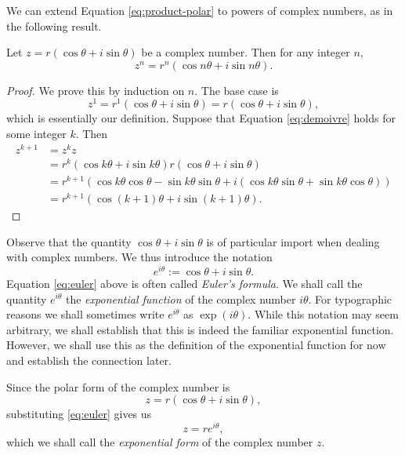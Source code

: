 We can extend Equation \eqref{eq:product-polar} to powers of complex numbers, as in the following result.

\begin{theorem}
    \label{thm:demoivre}
    Let \(z = r(\cos\theta + i\sin\theta)\) be a complex number. Then for any integer \(n\),
    \begin{equation}
        z^n = r^n(\cos n\theta + i\sin n\theta).
    \label{eq:demoivre}
    \end{equation}
    
\end{theorem}

\begin{proof}
    We prove this by induction on \(n\). The base case is 
    \[
        z^1 = r^1(\cos\theta + i\sin\theta) = r(\cos\theta + i\sin\theta),
    \]
    which is essentially our definition. Suppose that Equation \eqref{eq:demoivre} holds for some integer \(k\). Then
    \[
        \begin{aligned}
            z^{k + 1} &= z^kz \\
            &= r^k(\cos k\theta + i\sin k\theta)r(\cos\theta + i\sin\theta) \\
            &= r^{k + 1}(\cos k\theta\cos\theta - \sin k\theta\sin\theta + i(\cos k\theta\sin\theta + \sin k\theta\cos\theta)) \\
            &= r^{k + 1}(\cos(k + 1)\theta + i\sin(k + 1)\theta).
        \end{aligned}
    \]
\end{proof}

Observe that the quantity \(\cos \theta + i\sin \theta\) is of particular import when dealing with complex numbers. We thus introduce the notation
\begin{equation}
    e^{i\theta} := \cos\theta + i\sin\theta.
    \label{eq:euler}
\end{equation}
Equation \eqref{eq:euler} above is often called \emph{Euler's formula}. We shall call the quantity \(e^{i\theta}\) the \emph{exponential function} of the complex number \(i\theta\). For typographic reasons we shall sometimes write \(e^{i\theta}\) as \(\exp(i\theta)\). While this notation may seem arbitrary, we shall establish that this is indeed the familiar exponential function. However, we shall use this as the definition of the exponential function for now and establish the connection later.

Since the polar form of the complex number is
\[
    z = r(\cos\theta + i\sin\theta),
\]
substituting \eqref{eq:euler} gives us
\[
    z = re^{i\theta},
\]
which we shall call the \emph{exponential form} of the complex number \(z\).

